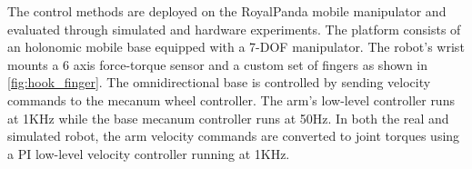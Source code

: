 The control methods are deployed on the RoyalPanda mobile manipulator and evaluated through simulated and hardware experiments. The platform consists of an holonomic mobile base equipped with a 7-DOF manipulator. The robot's wrist mounts a 6 axis force-torque sensor and a custom set of fingers as shown in \fig\ref{fig:hook_finger}.  The omnidirectional base is controlled by sending velocity commands to the mecanum wheel controller. The arm's low-level controller runs at 1KHz while the base mecanum controller runs at 50Hz. In both the real and simulated robot, the arm velocity commands are converted to joint torques using a PI low-level velocity controller running at 1KHz. 





